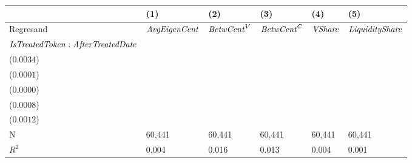 \begin{tabular}{llllll}
\toprule
{} &                                      (1) &                                      (2) &                                      (3) &                                      (4) &                                      (5) \\
\midrule
Regresand                                     &                     ${\it AvgEigenCent}$ &                       ${\it BetwCent}^V$ &                       ${\it BetwCent}^C$ &                           ${\it VShare}$ &                   ${\it LiquidityShare}$ \\
${\it IsTreatedToken}:{\it AfterTreatedDate}$ &  \makecell{$0.0182^{***}$ \\ ($0.0034$)} &  \makecell{$0.0004^{***}$ \\ ($0.0001$)} &  \makecell{$0.0002^{***}$ \\ ($0.0000$)} &  \makecell{$0.0049^{***}$ \\ ($0.0008$)} &  \makecell{$0.0080^{***}$ \\ ($0.0012$)} \\
\midrule N                                    &                                   60,441 &                                   60,441 &                                   60,441 &                                   60,441 &                                   60,441 \\
$R^2$                                         &                                    0.004 &                                    0.016 &                                    0.013 &                                    0.004 &                                    0.001 \\
\bottomrule
\end{tabular}
